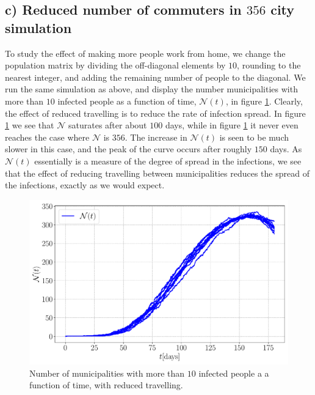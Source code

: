 \subsection{c) Reduced number of commuters in $356$ city simulation}

To study the effect of making more people work from home, we change the population matrix by dividing the off-diagonal elements by $10$, rounding to the nearest integer, and adding the remaining number of people to the diagonal. We run the same simulation as above, and display the number municipalities with more than $10$ infected people as a function of time, $\mathcal{N}(t)$,  in figure \ref{fig:infected_Ec}. Clearly, the effect of reduced travelling is to reduce the rate of infection spread. In figure \ref{fig:infected_Ec} we see that $\mathcal{N}$ saturates after about $100$ days, while in figure \ref{fig:infected_Ec} it never even reaches the case where $\mathcal{N}$ is $356$. The increase in $\mathcal{N}(t)$ is seen to be much slower in this case, and the peak of the curve occurs after roughly $150$ days. As $\mathcal{N}(t)$ essentially is a measure of the degree of spread in the infections, we see that the effect of reducing travelling between municipalities reduces the spread of the infections, exactly as we would expect.


\begin{figure}[htb]
	\centering
	\includegraphics[width=0.9\columnwidth]{../fig/2Ec_N.pdf}
	\caption{Number of municipalities with more than $10$ infected people a a function of time, with reduced travelling.}
	\label{fig:infected_Ec}
\end{figure}
